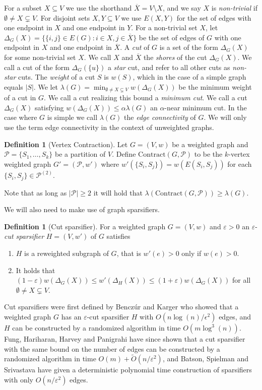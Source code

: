 \documentclass[10pt,a4paper]{article}
\newcommand{\Pcal}{\mathcal{P}}
\newcommand{\Contract}{\mathrm{Contract}}
\newcommand{\1}{\mathbf{1}}
\theoremstyle{definition}
\newtheorem{definition}[theorem]{Definition}
\begin{document}
For a subset $X \subseteq V$ we use the shorthand $\overline{X} = V \setminus X$, and we say $X$ is \emph{non-trivial} if $\emptyset \ne X \subsetneq V$.  
For disjoint sets $X,Y \subseteq V$ we use $E(X,Y)$ for the set of edges with one endpoint in $X$ and one endpoint in $Y$.
For a non-trivial set $X$, let $\Delta_G(X) = \{ \{i,j\} \in E(G) : i \in X, j \in \overline{X}\}$ be the set of edges 
of $G$ with one endpoint in $X$ and one endpoint in $\overline{X}$.  A \emph{cut} of $G$ is a set of the form $\Delta_G(X)$ for some non-trivial 
set $X$.  We call $X$ and $\overline{X}$ the \emph{shores} of the cut $\Delta_G(X)$.  We call a cut of the form $\Delta_G(\{u\})$ a \emph{star} cut, and refer 
to all other cuts as \emph{non-star} cuts.  The \emph{weight} of a cut $S$ is $w(S)$, which in the 
case of a simple graph equals $|S|$.  We let $\lambda(G) = \min_{\emptyset \ne X \subsetneq V} w(\Delta_G(X))$ be the minimum weight of a cut in $G$.  
We call a cut realizing this bound a \emph{minimum cut}.  We call a cut $\Delta_G(X)$ satisfying $w(\Delta_G(X)) \le \alpha \lambda(G)$ an $\alpha$-near minimum cut. 
In the case where $G$ is simple we call $\lambda(G)$ the \emph{edge connectivity} of $G$.  
We will only use the term edge connectivity in the context of unweighted graphs.


\begin{definition}[Vertex Contraction]
Let $G = (V,w)$ be a weighted graph and $\Pcal = \{S_1, \ldots, S_k\}$ be a partition of $V$.  Define $\Contract(G,\Pcal)$ to be 
the $k$-vertex weighted graph $G' = (\Pcal, w')$ where $w'(\{S_i,S_j\}) = w(E(S_i,S_j))$
for each $\{S_i, S_j\} \in \Pcal^{(2)}$.
\end{definition}
\noindent
Note that as long as $|\Pcal| \ge 2$ it will hold that $\lambda(\Contract(G,\Pcal)) \ge \lambda(G)$.  

We will also need to make use of graph sparsifiers. 
\begin{definition}[Cut sparsifier]
 For a weighted graph $G = (V,w)$ and $\varepsilon > 0$ an $\varepsilon$-\emph{cut sparsifier} $H = (V,w')$ of $G$ 
satisfies 
\begin{enumerate}
\item $H$ is a reweighted subgraph of $G$, that is $w'(e) > 0$ only if $w(e) > 0$.
\item It holds that $(1-\varepsilon) w(\Delta_G(X)) \le w'(\Delta_H(X)) \le (1+\varepsilon) w(\Delta_G(X))$ for all $\emptyset \neq X \subsetneq V$.
\end{enumerate}
\end{definition}
Cut sparsifiers were first defined by Bencz\'{u}r and Karger \cite{BK15} who showed that a weighted graph $G$ has an $\varepsilon$-cut sparsifier $H$ 
with $O(n \log(n)/\epsilon^2)$ edges, and $H$ can be constructed by a randomized algorithm in time $O(m \log^3(n))$.  
Fung, Hariharan, Harvey and Panigrahi \cite{FHHP19} have since shown that a cut sparsifier with the same bound on the number of edges can be constructed 
by a randomized algorithm in time $O(m) + \tilde O(n/\varepsilon^2)$, and Batson, Spielman and Srivastava \cite{BSS12} have given a deterministic 
polynomial time construction of sparsifiers with only $O(n/\varepsilon^2)$ edges.
\end{document}

